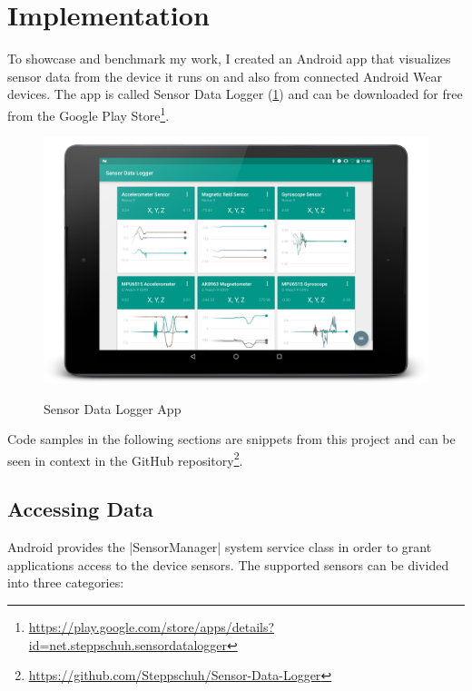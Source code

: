 \section{Implementation}
\label{sec:implementation}

To showcase and benchmark my work, I created an Android app that visualizes sensor data from the device it runs on and also from connected Android Wear devices.
The app is called Sensor Data Logger (\ref{fig:sensorDataLoggerApp}) and can be downloaded for free from the Google Play Store\footnote{\href{https://play.google.com/store/apps/details?id=net.steppschuh.sensordatalogger}{https://play.google.com/store/apps/details?id=net.steppschuh.sensordatalogger}}.

\begin{figure}[H]
	\href{https://github.com/Steppschuh/Sensor-Data-Logger}{
		\includegraphics[width=\linewidth]{images/app/charts_landscape_framed.png}
	}
	\caption[Caption for Sensor Data Logger App]{Sensor Data Logger App}
	\label{fig:sensorDataLoggerApp}
\end{figure}

Code samples in the following sections are snippets from this project and can be seen in context in the GitHub repository\footnote{\href{https://github.com/Steppschuh/Sensor-Data-Logger}{https://github.com/Steppschuh/Sensor-Data-Logger}}.

\clearpage

\subsection{Accessing Data}
\label{sec:implementation:accessingdata}

Android provides the |SensorManager|\cite{androiddocs:sensormanager} system service class in order to grant applications access to the device sensors.
The supported sensors can be divided into three categories:

